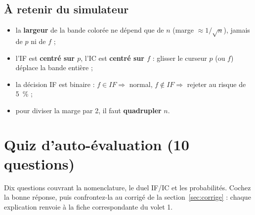 \documentclass[11pt,a4paper]{article}
\newcommand{\IF}{\textit{IF}}
\begin{document}
	\subsection{À retenir du simulateur}
	
	\begin{itemize}
		\item la \textbf{largeur} de la bande colorée ne dépend que de $n$
		(marge $\approx 1/\sqrt{n}$), jamais de $p$ ni de $f$ ;
		\item l'IF est \textbf{centré sur $p$}, l'IC est \textbf{centré sur $f$} :
		glisser le curseur $p$ (ou $f$) déplace la bande entière ;
		\item la décision IF est binaire : $f \in \IF{} \Rightarrow$ normal,
		$f \notin \IF{} \Rightarrow$ rejeter au risque de 5~\% ;
		\item pour diviser la marge par 2, il faut \textbf{quadrupler} $n$.
	\end{itemize}
	
	\section{Quiz d'auto-évaluation (10 questions)}
	
	Dix questions couvrant la nomenclature, le duel IF/IC et les probabilités.
	Cochez la bonne réponse, puis confrontez-la au corrigé de la
	section~\ref{sec:corrige} : chaque explication renvoie à la fiche
	correspondante du volet 1.
	
\end{document}
